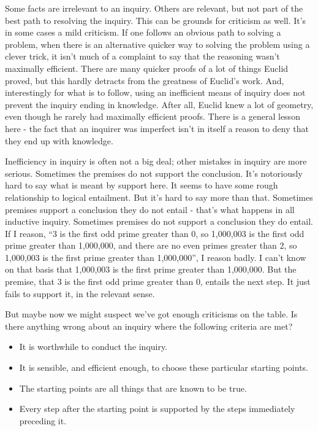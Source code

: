 \documentclass[
  12pt,
  letterpaper,
]{scrbook}
\providecommand{\tightlist}{%
  \setlength{\itemsep}{0pt}\setlength{\parskip}{0pt}}\usepackage{longtable,booktabs,array}
\begin{document}
Some facts are irrelevant to an inquiry. Others are relevant, but not
part of the best path to resolving the inquiry. This can be grounds for
criticism as well. It's in some cases a mild criticism. If one follows
an obvious path to solving a problem, when there is an alternative
quicker way to solving the problem using a clever trick, it isn't much
of a complaint to say that the reasoning wasn't maximally efficient.
There are many quicker proofs of a lot of things Euclid proved, but this
hardly detracts from the greatness of Euclid's work. And, interestingly
for what is to follow, using an inefficient means of inquiry does not
prevent the inquiry ending in knowledge. After all, Euclid knew a lot of
geometry, even though he rarely had maximally efficient proofs. There is
a general lesson here - the fact that an inquirer was imperfect isn't in
itself a reason to deny that they end up with knowledge.

Inefficiency in inquiry is often not a big deal; other mistakes in
inquiry are more serious. Sometimes the premises do not support the
conclusion. It's notoriously hard to say what is meant by support here.
It seems to have some rough relationship to logical entailment. But it's
hard to say more than that. Sometimes premises support a conclusion they
do not entail - that's what happens in all inductive inquiry. Sometimes
premises do not support a conclusion they do entail. If I reason, ``3 is
the first odd prime greater than 0, so 1,000,003 is the first odd prime
greater than 1,000,000, and there are no even primes greater than 2, so
1,000,003 is the first prime greater than 1,000,000'', I reason badly. I
can't know on that basis that 1,000,003 is the first prime greater than
1,000,000. But the premise, that 3 is the first odd prime greater than
0, entails the next step. It just fails to support it, in the relevant
sense.

But maybe now we might suspect we've got enough criticisms on the table.
Is there anything wrong about an inquiry where the following criteria
are met?

\begin{itemize}
\tightlist
\item
  It is worthwhile to conduct the inquiry.
\item
  It is sensible, and efficient enough, to choose these particular
  starting points.
\item
  The starting points are all things that are known to be true.
\item
  Every step after the starting point is supported by the steps
  immediately preceding it.
\end{itemize}
\end{document}

